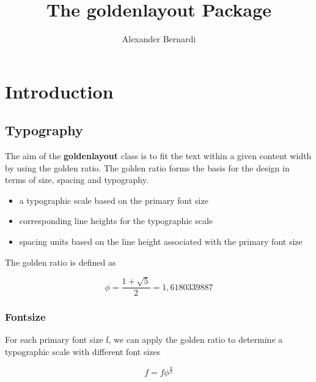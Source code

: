 \documentclass[a4paper,10pt]{scrarticle}
\title{\textnormal{The \textbf{goldenlayout} Package}}
\author{Alexander Bernardi}
\begin{document}
\maketitle

\section{Introduction}

\subsection{Typography}

The aim of the \textbf{goldenlayout} class is to fit the text within a given content width by using the golden ratio.
The golden ratio forms the basis for the design in terms of size, spacing and typography. 

\begin{itemize}
	\item a typographic scale based on the primary font size
	\item corresponding line heights for the typographic scale
	\item spacing units based on the line height associated with the primary font size
\end{itemize}

The golden ratio is defined as

\begin{equation}
\phi = \frac{1+\sqrt{5}}{2} = 1,6180339887
\end{equation}


\subsubsection{Fontsize}

For each primary font size f, we can apply the golden ratio to determine a typographic scale with different font sizes

\begin{equation}
f = f\phi^{\frac{n}{2}}
\end{equation}
\end{document}
